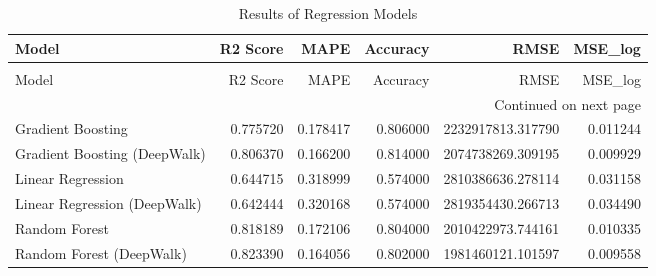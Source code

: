 \begin{longtable}{lrrrrr}
\caption{Results of Regression Models} \label{tab:regression_results} \\
\toprule
Model & R2 Score & MAPE & Accuracy & RMSE & MSE_log \\
\midrule
\endfirsthead
\caption[]{Results of Regression Models} \\
\toprule
Model & R2 Score & MAPE & Accuracy & RMSE & MSE_log \\
\midrule
\endhead
\midrule
\multicolumn{6}{r}{Continued on next page} \\
\midrule
\endfoot
\bottomrule
\endlastfoot
Gradient Boosting & 0.775720 & 0.178417 & 0.806000 & 2232917813.317790 & 0.011244 \\
Gradient Boosting (DeepWalk) & 0.806370 & 0.166200 & 0.814000 & 2074738269.309195 & 0.009929 \\
Linear Regression & 0.644715 & 0.318999 & 0.574000 & 2810386636.278114 & 0.031158 \\
Linear Regression (DeepWalk) & 0.642444 & 0.320168 & 0.574000 & 2819354430.266713 & 0.034490 \\
Random Forest & 0.818189 & 0.172106 & 0.804000 & 2010422973.744161 & 0.010335 \\
Random Forest (DeepWalk) & 0.823390 & 0.164056 & 0.802000 & 1981460121.101597 & 0.009558 \\
\end{longtable}
